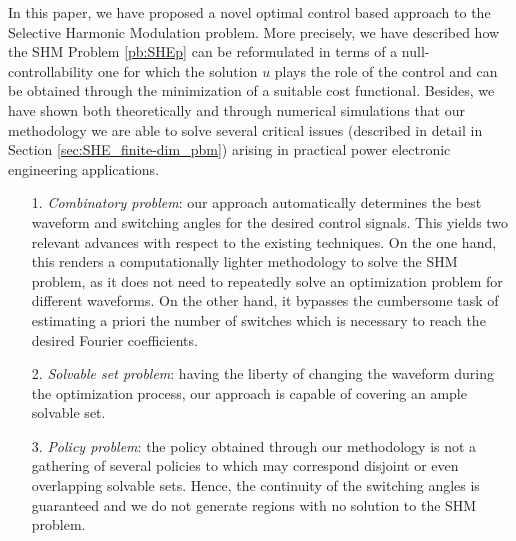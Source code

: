 \documentclass[9pt,shortpaper,twoside,web]{ieeecolor}
\begin{document}
In this paper, we have proposed a novel optimal control based approach to the Selective Harmonic Modulation problem. More precisely, we have described how the SHM Problem \ref{pb:SHEp} can be reformulated in terms of a null-controllability one for which the solution $u$ plays the role of the control and can be obtained through the minimization of a suitable cost functional. Besides, we have shown both theoretically and through numerical simulations that our methodology we are able to solve several critical issues (described in detail in Section \ref{sec:SHE_finite-dim_pbm}) arising in practical power electronic engineering applications.
\begin{itemize}
	\item[1.]  \textit{Combinatory problem}: our approach automatically determines the best waveform and switching angles for the desired control signals. This yields two relevant advances with respect to the existing techniques. On the one hand, this renders a computationally lighter methodology to solve the SHM problem, as it does not need to repeatedly solve an optimization problem for different waveforms. On the other hand, it bypasses the cumbersome task of estimating a priori the number of switches which is necessary to reach the desired Fourier coefficients.
	
	\item[2.] \textit{Solvable set problem}: having the liberty of changing the waveform during the optimization process, our approach is capable of covering an ample solvable set. 
	
	\item[3.] \textit{Policy problem}: the policy obtained through our methodology is not a gathering of several policies to which may correspond disjoint or even overlapping solvable sets. Hence, the continuity of the switching angles is guaranteed and we do not generate regions with no solution to the SHM problem.
\end{itemize}
\end{document}

